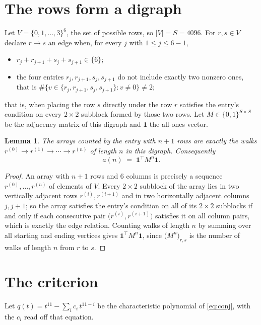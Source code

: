 \documentclass[11pt,a4paper]{article}
\theoremstyle{plain}
\newtheorem{lemma}[theorem]{Lemma}
\theoremstyle{definition}
\begin{document}
\section{The rows form a digraph}

Let $V=\{0,1,\dots,3\}^{6}$, the set of possible rows, so $|V|=S=4096$. For
$r,s\in V$ declare $r\to s$ an edge when, for every $j$ with $1\le j\le 6-1$,
\begin{itemize}
\item $r_j+r_{j+1}+s_j+s_{j+1}\in\{6\}$;
\item the four entries $r_j,r_{j+1},s_j,s_{j+1}$ do not include exactly two nonzero ones, that is $\#\bigl\{v\in\{r_j,r_{j+1},s_j,s_{j+1}\}: v\ne0\bigr\}\ne2$;
\end{itemize}
that is, when placing the row $s$ directly under the row $r$ satisfies the entry's
condition on every $2\times2$ subblock formed by those two rows. Let $M\in\{0,1\}^{S\times
S}$ be the adjacency matrix of this digraph and $\mathbf{1}$ the all-ones vector.

\begin{lemma}\label{lem:walk}
The arrays counted by the entry with $n+1$ rows are exactly the walks
$r^{(0)}\to r^{(1)}\to\cdots\to r^{(n)}$ of length $n$ in this digraph. Consequently
\[
a(n)\;=\;\mathbf{1}^{\!\top}M^{n}\mathbf{1} .
\]
\end{lemma}

\begin{proof}
An array with $n+1$ rows and $6$ columns is precisely a sequence
$r^{(0)},\dots,r^{(n)}$ of elements of $V$. Every $2\times2$ subblock of the array lies
in two vertically adjacent rows $r^{(i)},r^{(i+1)}$ and in two horizontally adjacent
columns $j,j+1$; so the array satisfies the entry's condition on all of its $2\times2$
subblocks if and only if each consecutive pair $\bigl(r^{(i)},r^{(i+1)}\bigr)$ satisfies
it on all column pairs, which is exactly the edge relation. Counting walks of length $n$ by
summing over all starting and ending vertices gives
$\mathbf{1}^{\!\top}M^{n}\mathbf{1}$, since
$\bigl(M^{n}\bigr)_{r,s}$ is the number of walks of length $n$ from $r$ to $s$.
\end{proof}

\section{The criterion}

Let $q(t)=t^{11}-\sum_{i}c_i\,t^{11-i}$ be the characteristic polynomial of
\eqref{eq:conj}, with the $c_i$ read off that equation.
\end{document}
